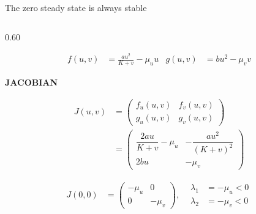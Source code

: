 \begin{frame}{The zero steady state is always stable}

  \vspace{-0.30cm}

  \begin{columns}[c,onlytextwidth]

    \begin{column}{0.60\textwidth}


      \vspace{-0.30cm}

      {\color{HydraWhite}\fontsize{8.6}{10.9}\selectfont
      \begin{align*}
        f(u,v)
        &=
        \frac{au^2}{K+v}-\mu_u u
        &
        g(u,v)
        &=
        bu^2-\mu_v v
      \end{align*}
      }

      \vspace{-0.46cm}

      {\color{HydraGold}\bfseries\fontsize{7.5}{9}\selectfont
        JACOBIAN\par}

      \vspace{-0.30cm}

      {\color{HydraWhite}\fontsize{8.3}{10.6}\selectfont
      \begin{align*}
        J(u,v)
        &=
        \begin{pmatrix}
          f_u(u,v)&f_v(u,v)
          \\
          g_u(u,v)&g_v(u,v)
        \end{pmatrix}
        \\
        &=
        \begin{pmatrix}
          \dfrac{2au}{K+v}-\mu_u
          &
          -\dfrac{au^2}{(K+v)^2}
          \\[0.14cm]
          2bu
          &
          -\mu_v
        \end{pmatrix}
      \end{align*}
      }

      \vspace{-0.50cm}

      {\color{HydraWhite}\fontsize{9.4}{12}\selectfont
      \begin{align*}
        J(0,0)
        &=
        \begin{pmatrix}
          -\mu_u&0
          \\
          0&-\mu_v
        \end{pmatrix}
        ,
        &
        \begin{aligned}
          \lambda_1&=-\mu_u<0
          \\
          \lambda_2&=-\mu_v<0
        \end{aligned}
      \end{align*}
      }


\end{column}
\end{columns}
\end{frame}
